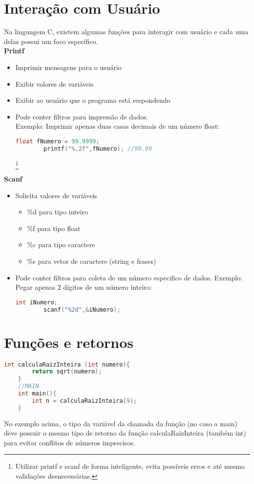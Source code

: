 \documentclass[12pt]{article}
\begin{document}
\section{Interação com Usuário}\label{printfscanf}
Na linguagem C, existem algumas funções para interagir com usuário e cada uma delas possui um foco específico.\\
\textbf{Printf}\label{printf}
\begin{itemize}
	\item Imprimir mensagens para o usuário
	\item Exibir valores de variáveis
	\item Exibir ao usuário que o programa está respondendo
	\item Pode conter filtros para impressão de dados. \\
	Exemplo: Imprimir apenas duas casas decimais de um número float:
	\begin{lstlisting}[language=C]
		float fNumero = 99.9999;
		printf("%.2f",fNumero); //99.99
	\end{lstlisting}
\footnote{Utilizar printf e scanf de forma inteligente, evita possíveis erros e até mesmo validações desnecessárias.}
\end{itemize}
\textbf{Scanf}\label{key}

\begin{itemize}
	\item Solicita valores de variáveis
	\begin{itemize}
		\item \%d para tipo inteiro
		\item \%f para tipo float
		\item \%c para tipo caractere
		\item \%s para vetor de caractere (string e frases)
		
	\end{itemize}
	\item Pode conter filtros para coleta de um número especifico de dados. Exemplo: Pegar apenas 2 dígitos de um número inteiro:
	\begin{lstlisting}[language=C]
		int iNumero;
		scanf("%2d",&iNumero);
	\end{lstlisting}
\end{itemize}
\section{Funções e retornos}
\begin{lstlisting}[language=C]
	int calculaRaizInteira (int numero){
		return sqrt(numero);
	}
	//MAIN
	int main(){
		int n = calculaRaizInteira(9);
	}
\end{lstlisting}
No exemplo acima, o tipo da variável da chamada da função (no caso a main) deve possuir o mesmo tipo de retorno da função calculaRaizInteira (também int) para evitar conflitos de números imprecisos.
\end{document}
